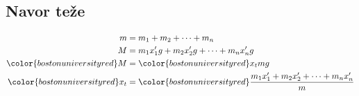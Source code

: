 {\color{indiagreen}\subsection{Navor teže}}
\begin{align*}
	m &= m_1 + m_2 + \dots + m_n\\
	M &= m_1x_1'g + m_2x_2'g + \dots + m_nx_n'g\\
	{\color{bostonuniversityred}M} &= {\color{bostonuniversityred}x_tmg}\\
	{\color{bostonuniversityred}x_t} &= {\color{bostonuniversityred}\frac{m_1x_1' + m_2x_2' + \dots + m_nx_n'}{m}}\\ 
\end{align*}